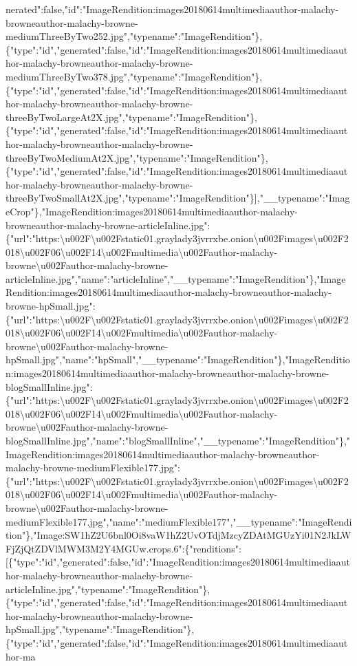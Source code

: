 nerated":false,"id":"ImageRendition:images20180614multimediaauthor-malachy-browneauthor-malachy-browne-mediumThreeByTwo252.jpg","typename":"ImageRendition"\},\{"type":"id","generated":false,"id":"ImageRendition:images20180614multimediaauthor-malachy-browneauthor-malachy-browne-mediumThreeByTwo378.jpg","typename":"ImageRendition"\},\{"type":"id","generated":false,"id":"ImageRendition:images20180614multimediaauthor-malachy-browneauthor-malachy-browne-threeByTwoLargeAt2X.jpg","typename":"ImageRendition"\},\{"type":"id","generated":false,"id":"ImageRendition:images20180614multimediaauthor-malachy-browneauthor-malachy-browne-threeByTwoMediumAt2X.jpg","typename":"ImageRendition"\},\{"type":"id","generated":false,"id":"ImageRendition:images20180614multimediaauthor-malachy-browneauthor-malachy-browne-threeByTwoSmallAt2X.jpg","typename":"ImageRendition"\}{]},"\_\_typename":"ImageCrop"\},"ImageRendition:images20180614multimediaauthor-malachy-browneauthor-malachy-browne-articleInline.jpg":\{"url":"https:\textbackslash{}u002F\textbackslash{}u002Fstatic01.graylady3jvrrxbe.onion\textbackslash{}u002Fimages\textbackslash{}u002F2018\textbackslash{}u002F06\textbackslash{}u002F14\textbackslash{}u002Fmultimedia\textbackslash{}u002Fauthor-malachy-browne\textbackslash{}u002Fauthor-malachy-browne-articleInline.jpg","name":"articleInline","\_\_typename":"ImageRendition"\},"ImageRendition:images20180614multimediaauthor-malachy-browneauthor-malachy-browne-hpSmall.jpg":\{"url":"https:\textbackslash{}u002F\textbackslash{}u002Fstatic01.graylady3jvrrxbe.onion\textbackslash{}u002Fimages\textbackslash{}u002F2018\textbackslash{}u002F06\textbackslash{}u002F14\textbackslash{}u002Fmultimedia\textbackslash{}u002Fauthor-malachy-browne\textbackslash{}u002Fauthor-malachy-browne-hpSmall.jpg","name":"hpSmall","\_\_typename":"ImageRendition"\},"ImageRendition:images20180614multimediaauthor-malachy-browneauthor-malachy-browne-blogSmallInline.jpg":\{"url":"https:\textbackslash{}u002F\textbackslash{}u002Fstatic01.graylady3jvrrxbe.onion\textbackslash{}u002Fimages\textbackslash{}u002F2018\textbackslash{}u002F06\textbackslash{}u002F14\textbackslash{}u002Fmultimedia\textbackslash{}u002Fauthor-malachy-browne\textbackslash{}u002Fauthor-malachy-browne-blogSmallInline.jpg","name":"blogSmallInline","\_\_typename":"ImageRendition"\},"ImageRendition:images20180614multimediaauthor-malachy-browneauthor-malachy-browne-mediumFlexible177.jpg":\{"url":"https:\textbackslash{}u002F\textbackslash{}u002Fstatic01.graylady3jvrrxbe.onion\textbackslash{}u002Fimages\textbackslash{}u002F2018\textbackslash{}u002F06\textbackslash{}u002F14\textbackslash{}u002Fmultimedia\textbackslash{}u002Fauthor-malachy-browne\textbackslash{}u002Fauthor-malachy-browne-mediumFlexible177.jpg","name":"mediumFlexible177","\_\_typename":"ImageRendition"\},"Image:SW1hZ2U6bnl0Oi8vaW1hZ2UvOTdjMzcyZDAtMGUzYi01N2JkLWFjZjQtZDVlMWM3M2Y4MGUw.crops.6":\{"renditions":{[}\{"type":"id","generated":false,"id":"ImageRendition:images20180614multimediaauthor-malachy-browneauthor-malachy-browne-articleInline.jpg","typename":"ImageRendition"\},\{"type":"id","generated":false,"id":"ImageRendition:images20180614multimediaauthor-malachy-browneauthor-malachy-browne-hpSmall.jpg","typename":"ImageRendition"\},\{"type":"id","generated":false,"id":"ImageRendition:images20180614multimediaauthor-ma